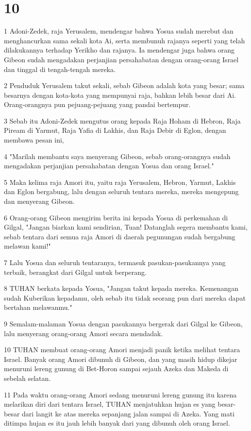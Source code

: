 \chapter{10}

\par 1 Adoni-Zedek, raja Yerusalem, mendengar bahwa Yosua sudah merebut dan menghancurkan sama sekali kota Ai, serta membunuh rajanya seperti yang telah dilakukannya terhadap Yerikho dan rajanya. Ia mendengar juga bahwa orang Gibeon sudah mengadakan perjanjian persahabatan dengan orang-orang Israel dan tinggal di tengah-tengah mereka.
\par 2 Penduduk Yerusalem takut sekali, sebab Gibeon adalah kota yang besar; sama besarnya dengan kota-kota yang mempunyai raja, bahkan lebih besar dari Ai. Orang-orangnya pun pejuang-pejuang yang pandai bertempur.
\par 3 Sebab itu Adoni-Zedek mengutus orang kepada Raja Hoham di Hebron, Raja Piream di Yarmut, Raja Yafia di Lakhis, dan Raja Debir di Eglon, dengan membawa pesan ini,
\par 4 "Marilah membantu saya menyerang Gibeon, sebab orang-orangnya sudah mengadakan perjanjian persahabatan dengan Yosua dan orang Israel."
\par 5 Maka kelima raja Amori itu, yaitu raja Yerusalem, Hebron, Yarmut, Lakhis dan Eglon bergabung, lalu dengan seluruh tentara mereka, mereka mengepung dan menyerang Gibeon.
\par 6 Orang-orang Gibeon mengirim berita ini kepada Yosua di perkemahan di Gilgal, "Jangan biarkan kami sendirian, Tuan! Datanglah segera membantu kami, sebab tentara dari semua raja Amori di daerah pegunungan sudah bergabung melawan kami!"
\par 7 Lalu Yosua dan seluruh tentaranya, termasuk pasukan-pasukannya yang terbaik, berangkat dari Gilgal untuk berperang.
\par 8 TUHAN berkata kepada Yosua, "Jangan takut kepada mereka. Kemenangan sudah Kuberikan kepadamu, oleh sebab itu tidak seorang pun dari mereka dapat bertahan melawanmu."
\par 9 Semalam-malaman Yosua dengan pasukannya bergerak dari Gilgal ke Gibeon, lalu menyerang orang-orang Amori secara mendadak.
\par 10 TUHAN membuat orang-orang Amori menjadi panik ketika melihat tentara Israel. Banyak orang Amori dibunuh di Gibeon, dan yang masih hidup dikejar menuruni lereng gunung di Bet-Horon sampai sejauh Azeka dan Makeda di sebelah selatan.
\par 11 Pada waktu orang-orang Amori sedang menuruni lereng gunung itu karena melarikan diri dari tentara Israel, TUHAN menjatuhkan hujan es yang besar-besar dari langit ke atas mereka sepanjang jalan sampai di Azeka. Yang mati ditimpa hujan es itu jauh lebih banyak dari yang dibunuh oleh orang Israel.
